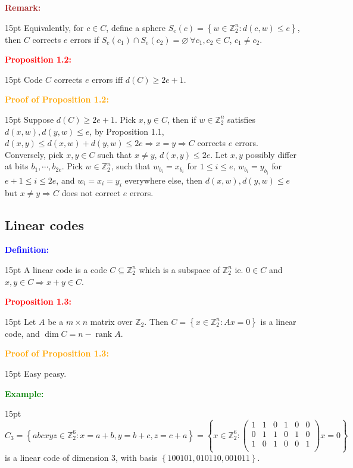 \documentclass[12pt]{article}
\newcommand{\noparskip}{\vspace{-\parskip}}
\newenvironment{dent}
	{\begin{adjustwidth}{15pt}{}\noparskip}
	{\end{adjustwidth}}
\newenvironment{result}[1]
	{\textcolor{Red}{\textbf{#1:}}\begin{dent}}
	{\end{dent}}
\newenvironment{proof}[1]
	{\textcolor{Orange}{\textbf{Proof of #1:}}\begin{dent}}
	{\end{dent}}
\newenvironment{definition}
	{\textcolor{Blue}{\textbf{Definition:}}\begin{dent}}
	{\end{dent}}
\newenvironment{example}
	{\textcolor{Green}{\textbf{Example:}}\begin{dent}}
	{\end{dent}}
\newenvironment{remark}
	{\textcolor{Brown}{\textbf{Remark:}}\begin{dent}}
	{\end{dent}}
\renewcommand{\implies}{\Rightarrow}
\newcommand{\set}[1]{\left\{ #1 \right\}}
\newcommand{\Z}{\mathbb{Z}}
\newcommand{\rank}{\operatorname{rank}}
\begin{document}
\begin{remark}
Equivalently, for $c \in C$, define a sphere $S_e(c) = \set{w \in \Z_2^n: d(c, w) \le e}$, then $C$ corrects $e$ errors if $S_e(c_1) \cap S_e(c_2) = \varnothing\ \forall c_1, c_2 \in C$, $c_1 \ne c_2$.
\end{remark}

\begin{result}{Proposition 1.2}
Code $C$ corrects $e$ errors iff $d(C) \ge 2e + 1$.
\end{result}

\begin{proof}{Proposition 1.2}
Suppose $d(C) \ge 2e + 1$. Pick $x, y \in C$, then if $w \in \Z_2^n$ satisfies $d(x, w), d(y, w) \le e$, by Proposition 1.1, $d(x, y) \le d(x, w) + d(y, w) \le 2e \implies x = y \implies C$ corrects $e$ errors. \\
Conversely, pick $x, y \in C$ such that $x \ne y$, $d(x, y) \le 2e$. Let $x, y$ possibly differ at bits $b_1, \cdots, b_{2e}$. Pick $w \in \Z_2^n$, such that $w_{b_i} = x_{b_i}$ for $1 \le i \le e$, $w_{b_i} = y_{b_i}$ for $e + 1 \le i \le 2e$, and $w_i = x_i = y_i$ everywhere else, then $d(x, w), d(y, w) \le e$ but $x \ne y \implies C$ does not correct $e$ errors.
\end{proof}

\subsection{Linear codes}

\begin{definition}
A linear code is a code $C \subseteq \Z_2^n$ which is a subspace of $\Z_2^n$ ie. $0 \in C$ and $x, y \in C \implies x + y \in C$.
\end{definition}

\begin{result}{Proposition 1.3}
Let $A$ be a $m \times n$ matrix over $\Z_2$. Then $C = \set{x \in \Z_2^n: Ax = 0}$ is a linear code, and $\dim C = n - \rank A$.
\end{result}

\begin{proof}{Proposition 1.3}
Easy peasy.
\end{proof}

\begin{example}
$C_3 = \set{abcxyz \in \Z_2^6: x = a + b, y = b + c, z = c + a} = \set{x \in \Z_2^6: \begin{pmatrix}
1 & 1 & 0 & 1 & 0 & 0 \\
0 & 1 & 1 & 0 & 1 & 0 \\
1 & 0 & 1 & 0 & 0 & 1 \\
\end{pmatrix} x = 0}$ is a linear code of dimension 3, with basis $\set{100101, 010110, 001011}$.
\end{example}
\end{document}
